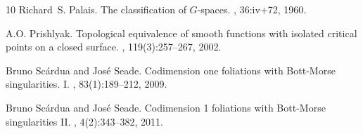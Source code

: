 \documentclass[10pt,reqno]{amsart}
\begin{document}
\begin{thebibliography}{10}
	Richard~S. Palais.
	\newblock The classification of {$G$}-spaces.
	, 36:iv+72, 1960.
	
	A.O. Prishlyak.
	\newblock Topological equivalence of smooth functions with isolated critical
	points on a closed surface.
	, 119(3):257--267, 2002.
	
	Bruno Sc\'{a}rdua and Jos\'{e} Seade.
	\newblock Codimension one foliations with {B}ott-{M}orse singularities. {I}.
	, 83(1):189--212, 2009.
	
	Bruno Sc\'{a}rdua and Jos\'{e} Seade.
	\newblock Codimension 1 foliations with {B}ott-{M}orse singularities {II}.
	, 4(2):343--382, 2011.
	
\end{thebibliography}
\end{document}
